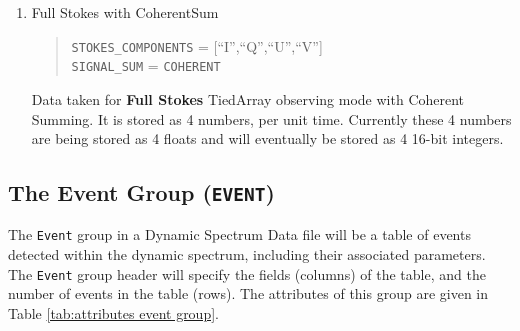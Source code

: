 \documentclass[a4paper,10pt,bibtotoc]{scrartcl}
\begin{document}
\begin{enumerate}
\item{Full Stokes with CoherentSum}
  
  \begin{verse} \small
    \verb|STOKES_COMPONENTS| = [``I'',``Q'',``U'',``V''] \\
    \verb|SIGNAL_SUM| = \verb|COHERENT|
  \end{verse}

  Data taken for \textbf{Full Stokes} TiedArray observing mode with Coherent
  Summing. It is stored as 4 numbers, per unit time.  Currently these 4 numbers
  are being stored as 4 floats and will eventually be stored as 4 16-bit
  integers.  
  
\end{enumerate}


\subsection{The Event Group ({\tt EVENT})}
\label{sec:event group}

The \texttt{Event} group in a Dynamic Spectrum Data file will be a table of
events detected within the dynamic spectrum, including their associated 
parameters.
The \texttt{Event} group header will
specify the fields (columns) of the table, and the number of events in the table
(rows). The attributes of this group are given in Table \ref{tab:attributes
event group}. 

\end{document}
